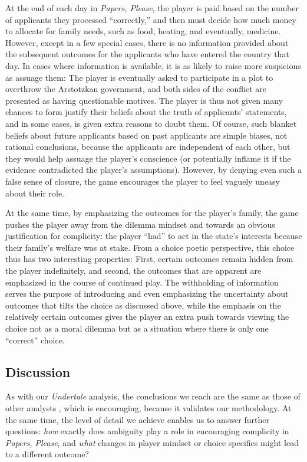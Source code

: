 \documentclass[arts,article,submit,moreauthors,pdftex,10pt,a4paper]{Definitions/mdpi}
\begin{document}
At the end of each day in \emph{Papers, Please}, the player is paid based on the number of applicants they processed ``correctly,'' and then must decide how much money to allocate for family needs, such as food, heating, and eventually, medicine.
%
However, except in a few special cases, there is no information provided about the subsequent outcomes for the applicants who have entered the country that day.
%
In cases where information is available, it is as likely to raise more suspicions as assuage them: The player is eventually asked to participate in a plot to overthrow the Arstotzkan government, and both sides of the conflict are presented as having questionable motives.
%
The player is thus not given many chances to form justify their beliefs about the truth of applicants' statements, and in some cases, is given extra reasons to doubt them.
%
Of course, such blanket beliefs about future applicants based on past applicants are simple biases, not rational conclusions, because the applicants are independent of each other, but they would help assuage the player's conscience (or potentially inflame it if the evidence contradicted the player's assumptions).
%
However, by denying even such a false sense of closure, the game encourages the player to feel vaguely uneasy about their role.



At the same time, by emphasizing the outcomes for the player's family, the game pushes the player away from the dilemma mindset and towards an obvious justification for complicity: the player ``had'' to act in the state's interests because their family's welfare was at stake.
%
From a choice poetic perspective, this choice thus has two interesting properties: First, certain outcomes remain hidden from the player indefinitely, and second, the outcomes that are apparent are emphasized in the course of continued play.
%
The withholding of information serves the purpose of introducing and even emphasizing the uncertainty about outcomes that tilts the choice as discussed above, while the emphasis on the relatively certain outcomes gives the player an extra push towards viewing the choice not as a moral dilemma but as a situation where there is only one ``correct'' choice.

\subsection{Discussion}

As with our \emph{Undertale} analysis, the conclusions we reach are the same as those of other analysts \citep{alexander2013designing,formosa2016papers}, which is encouraging, because it validates our methodology.
%
At the same time, the level of detail we achieve enables us to answer further questions: \emph{how} exactly does ambiguity play a role in encouraging complicity in \emph{Papers, Please}, and \emph{what} changes in player mindset or choice specifics might lead to a different outcome?
\end{document}
